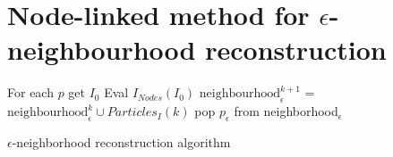 \documentclass[preprint,12pt,a4paper]{elsarticle}
\begin{document}
\section{Node-linked method for $\epsilon$-neighbourhood reconstruction}
\label{sec:node-linked-method-1}
\begin{algorithm}[H]
  \DontPrintSemicolon
  {
    For each $p$ get $I_0$\;
    Eval $I_{Nodes}(I_0)$ \;
    {
      $\text{neighbourhood}_{\epsilon}^{k+1}$ = $\text{neighbourhood}_{\epsilon}^{k} \cup Particles_I(k)$
    }
    {
      {
        pop $p_{\epsilon}$ from neighborhood$_{\epsilon}$\;
      }      
    }
    
  }
  \label{alg-node-link}
  \caption{$\epsilon$-neighborhood reconstruction algorithm}
\end{algorithm} 

 
\end{document}
